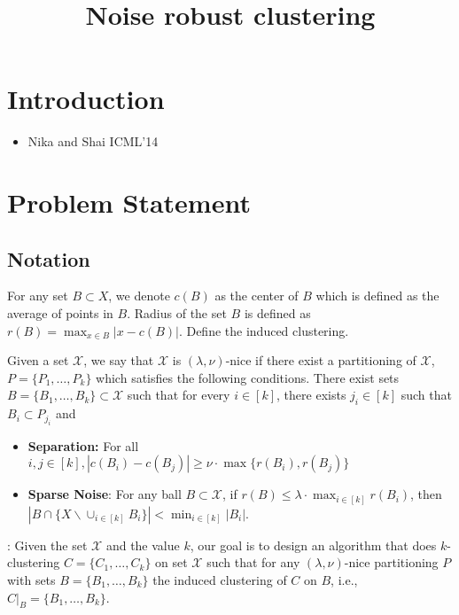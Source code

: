\documentclass[11pt]{article}
\title{\LARGE Noise robust clustering}
\author{}
\begin{document}
\maketitle

\section{Introduction}
\begin{itemize}
\item Nika and Shai ICML'14
\end{itemize}

\section{Problem Statement}

\subsection{Notation}
For any set $B\subset X$, we denote $c(B)$ as the center of $B$ which is defined as the average of points in $B$. Radius of the set $B$ is defined as $r(B)=\max_{x\in B} |x-c(B)|$. Define the induced clustering.

\begin{definition}
Given a set $\mathcal{X}$, we say that $\mathcal{X}$ is $(\lambda,\nu)$-nice if there exist a partitioning of $\mathcal{X}$, $P=\{P_1,\ldots,P_k\}$ which satisfies the following conditions. There exist sets $B=\{B_1,\ldots,B_k\}\subset \mathcal{X}$ such that for every $i\in[k]$, there exists $j_i\in[k]$ such that $B_i\subset P_{j_i}$ and
\begin{itemize}
\item{\bf{Separation}:} For all $i,j\in[k], |c(B_i)-c(B_j)|\geq \nu\cdot\max\{r(B_i),r(B_j)\}$
\item{\bf{Sparse Noise}}: For any ball $B\subset \mathcal{X}$, if $r(B)\leq \lambda \cdot \max_{i\in[k]} r(B_i)$, then $|B\cap \{X \backslash \cup_{i\in[k]} B_i\}| < \min_{i\in[k]}|B_i|$.
\end{itemize}
\end{definition}


: Given the set $\mathcal{X}$ and the value $k$, our goal is to design an algorithm that does $k$-clustering $C=\{C_1,\ldots,C_k\}$ on set $\mathcal{X}$ such that  for any $(\lambda,\nu)$-nice partitioning $P$ with sets $B = \{B_1,\ldots,B_k\}$ the induced clustering of $C$ on $B$, i.e., $C|_B = \{B_1,\ldots,B_k\}$. 
\end{document}
